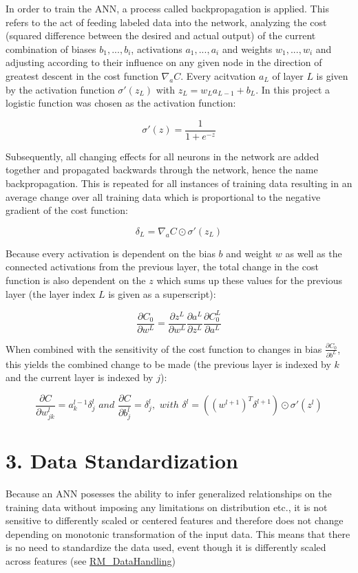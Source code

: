 \documentclass[]{article}
\begin{document}
In order to train the ANN, a process called backpropagation is applied.
This refers to the act of feeding labeled data into the network,
analyzing the cost (squared difference between the desired and actual
output) of the current combination of biases \(b_{1},...,b_{i}\),
activations \(a_{1},...,a_{i}\) and weights \(w_{1},...,w_{i}\) and
adjusting according to their influence on any given node in the
direction of greatest descent in the cost function \(\nabla_{a}C\).
Every acitvation \(a_L\) of layer \(L\) is given by the activation
function \(\sigma'(z_{L})\) with \(z_{L}=w_{L}a_{L-1}+b_{L}\). In this
project a logistic function was chosen as the activation function:

\[\sigma'(z)=\frac{1}{1+e^{-z}}\]

Subsequently, all changing effects for all neurons in the network are
added together and propagated backwards through the network, hence the
name backpropagation. This is repeated for all instances of training
data resulting in an average change over all training data which is
proportional to the negative gradient of the cost function:

\[\delta_L=\nabla_aC\odot\sigma'(z_L)\]

Because every activation is dependent on the bias \(b\) and weight \(w\)
as well as the connected activations from the previous layer, the total
change in the cost function is also dependent on the \(z\) which sums up
these values for the previous layer (the layer index \(L\) is given as a
superscript):

\[\frac{\partial C_0}{\partial w^{L}}=\frac{\partial z^L}{\partial w^L}\frac{\partial a^L}{\partial z^L}\frac{\partial C_0^L}{\partial a^L}\]

When combined with the sensitivity of the cost function to changes in
bias \(\frac{\partial C_0}{\partial b^L}\), this yields the combined
change to be made (the previous layer is indexed by \(k\) and the
current layer is indexed by \(j\)):

\[\frac{\partial C}{\partial w_{jk}^l}=a_{k}^{l-1}\delta_j^l\,\, and \,\,\frac{\partial C}{\partial b_j^l}=\delta_j^l, \,\, with\,\,\delta^l=((w^{l+1})^T\delta^{l+1})\odot\sigma'(z^l)\]

\hypertarget{data-standardization}{%
\section{3. Data Standardization}\label{data-standardization}}

Because an ANN posesses the ability to infer generalized relationships
on the training data without imposing any limitations on distribution
etc., it is not sensitive to differently scaled or centered features and
therefore does not change depending on monotonic transformation of the
input data. This means that there is no need to standardize the data
used, event though it is differently scaled across features (see
\href{https://github.com/NicSchuler/DSF_NFLDraftPrediction/tree/master/Data/READMEs}{RM\_DataHandling})
\end{document}
